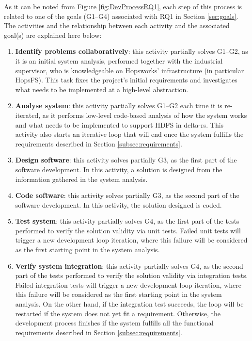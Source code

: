 As it can be noted from Figure \ref{fig:DevProcessRQ1}, each step of this process is related to one of the goals (G1--G4) associated with RQ1 in Section \ref{sec:goals}.
The activities and the relationship between each activity and the associated goal(s) are explained here below:
\begin{enumerate}
    \item \textbf{Identify problems collaboratively}: this activity partially solves G1--G2, as it is an initial system analysis, performed together with the industrial supervisor, who is knowledgeable on Hopsworks' infrastructure (in particular \gls{HopsFS}). This task fixes the project's initial requirements and investigates what needs to be implemented at a high-level abstraction.
    \item \textbf{Analyse system}: this activity partially solves G1--G2 each time it is re-iterated, as it performs low-level code-based analysis of how the system works and what needs to be implemented to support \gls{HDFS} in delta-rs. This activity also starts an iterative loop that will end once the system fulfills the requirements described in Section \ref{subsec:requirements}.
    \item \textbf{Design software}: this activity solves partially G3, as the first part of the software development. In this activity, a solution is designed from the information gathered in the system analysis.
    \item \textbf{Code software}: this activity solves partially G3, as the second part of the software development. In this activity, the solution designed is coded.
    \item \textbf{Test system}: this activity partially solves G4, as the first part of the tests performed to verify the solution validity via unit tests. Failed unit tests will trigger a new development loop iteration, where this failure will be considered as the first starting point in the system analysis.
    \item \textbf{Verify system integration}: this activity partially solves G4, as the second part of the tests performed to verify the solution validity via integration tests. Failed integration tests will trigger a new development loop iteration, where this failure will be considered as the first starting point in the system analysis. On the other hand, if the integration test succeeds, the loop will be restarted if the system does not yet fit a requirement. Otherwise, the development process finishes if the system fulfills all the functional requirements described in Section \ref{subsec:requirements}.
\end{enumerate}


